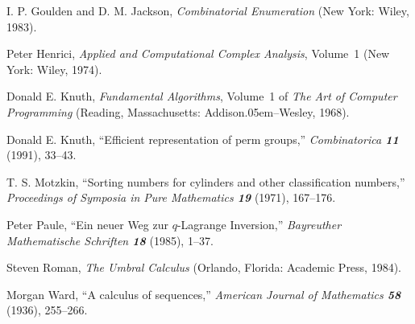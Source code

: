 \medskip\bib
[\GJ]\quad
I. P. Goulden and D. M. Jackson, {\sl Combinatorial Enumeration\/}
(New York: Wiley, 1983).


\medskip\bib
[\Hi]\quad
Peter Henrici, {\sl Applied and Computational Complex Analysis},
Volume~1 (New York: Wiley, 1974).

\medskip\bib
[\Ki]\quad
Donald E. Knuth, {\sl Fundamental Algorithms}, Volume~1 of {\sl The
Art of Computer Programming\/} (Reading, Massachusetts:
Addison\kern.05em--Wesley, 1968).

\medskip\bib
[\Perm]\quad
Donald E. Knuth, ``Efficient representation of perm groups,''
{\sl Combinatorica\/ \bf 11}\allowbreak
 (1991), 33--43.

\medskip\bib
[\Motz]\quad
T. S. Motzkin, ``Sorting numbers for cylinders and other
classification numbers,'' {\sl Proceedings of Symposia in Pure
Mathematics\/ \bf 19} (1971), 167--176.

\medskip\bib\bibbak
[\PP]\quad
Peter Paule, ``Ein neuer Weg zur $q$-Lagrange Inversion,''
{\sl Bayreuther Mathematische Schriften\/ \bf18} (1985), 1--37.

\medskip\bib\bibbak
[\SR]\quad
Steven Roman, {\sl The Umbral Calculus\/} (Orlando, Florida: Academic
Press, 1984).

\medskip\bib\bibbak
[\MW]\quad
Morgan Ward, ``A calculus of sequences,'' {\sl American Journal of
Mathematics\/ \bf 58} (1936), 255--266.


\bye

